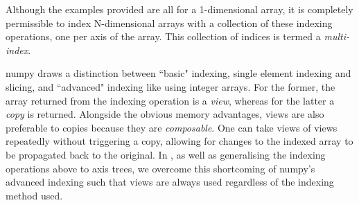 \documentclass[thesis]{subfiles}
\begin{document}
Although the examples provided are all for a 1-dimensional array, it is completely permissible to index N-dimensional arrays with a collection of these indexing operations, one per axis of the array.
This collection of indices is termed a \textit{multi-index}.

numpy draws a distinction between ``basic" indexing, single element indexing and slicing, and ``advanced" indexing like using integer arrays.
For the former, the array returned from the indexing operation is a \textit{view}, whereas for the latter a \textit{copy} is returned.
Alongside the obvious memory advantages, views are also preferable to copies because they are \textit{composable}.
One can take views of views repeatedly without triggering a copy, allowing for changes to the indexed array to be propagated back to the original.
In , as well as generalising the indexing operations above to axis trees, we overcome this shortcoming of numpy's advanced indexing such that views are always used regardless of the indexing method used.
\end{document}
